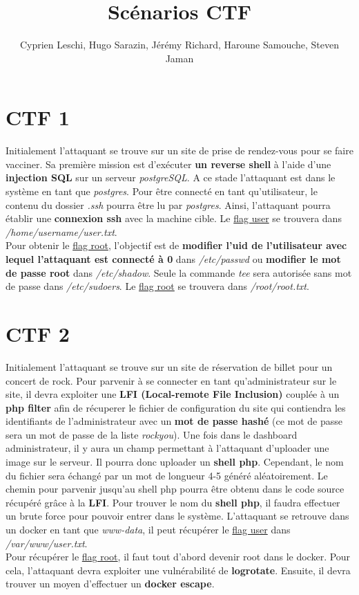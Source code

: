 \documentclass{article}
\title{Scénarios CTF}
\author{Cyprien Leschi, Hugo Sarazin, Jérémy Richard, Haroune Samouche, Steven Jaman}
\begin{document}
\maketitle

\section{CTF 1}

Initialement l'attaquant se trouve sur un site de prise de rendez-vous pour se faire vacciner. 
Sa première mission est d'exécuter \textbf{un reverse shell} à l'aide d'une \textbf{injection SQL} sur un serveur \emph{postgreSQL}. 
A ce stade l'attaquant est dans le système en tant que \emph{postgres}. Pour être connecté en tant qu'utilisateur, le contenu du dossier \emph{.ssh} pourra être lu par \emph{postgres}.
Ainsi, l'attaquant pourra établir une \textbf{connexion ssh} avec la machine cible. 
Le \underline{flag user} se trouvera dans \emph{/home/username/user.txt}.  \\

Pour obtenir le \underline{flag root}, l'objectif est de \textbf{modifier l'uid de l'utilisateur avec lequel l'attaquant est connecté à 0} dans \emph{/etc/passwd} ou \textbf{modifier le mot de passe root} dans \emph{/etc/shadow}. 
Seule la commande \emph{tee} sera autorisée sans mot de passe dans \emph{/etc/sudoers}. 
Le \underline{flag root} se trouvera dans \emph{/root/root.txt}.


\section{CTF 2}

Initialement l'attaquant se trouve sur un site de réservation de billet pour un concert de rock. 
Pour  parvenir à se connecter en tant qu'administrateur sur le site, il devra exploiter une \textbf{LFI (Local-remote File Inclusion)} couplée à un \textbf{php filter} 
afin de récuperer le fichier de configuration du site qui contiendra les identifiants de l'administrateur avec un \textbf{mot de passe hashé} (ce mot de passe sera un mot de passe de la liste \emph{rockyou}). 
Une fois dans le dashboard administrateur, il y aura un champ permettant à l'attaquant d'uploader une image sur le serveur.
Il pourra donc uploader un \textbf{shell php}. 
Cependant, le nom du fichier sera échangé par un mot de longueur 4-5 généré aléatoirement. 
Le chemin pour parvenir jusqu'au shell php pourra être obtenu dans le code source récupéré grâce à la \textbf{LFI}. 
Pour trouver le nom du \textbf{shell php}, il faudra effectuer un brute force 
pour pouvoir entrer dans le système.
 L'attaquant se retrouve dans un docker en tant que \emph{www-data}, il peut récupérer le \underline{flag user} dans \emph{/var/www/user.txt}. \\

Pour récupérer le \underline{flag root}, il faut tout d'abord devenir root dans le docker. 
Pour cela, l'attaquant devra exploiter une vulnérabilité de \textbf{logrotate}.
Ensuite, il devra trouver un moyen d'effectuer un \textbf{docker escape}. 
\end{document}
